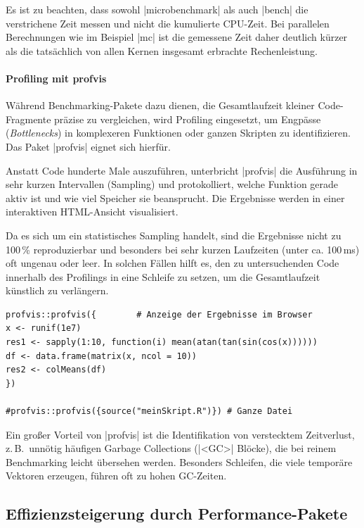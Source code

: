 \documentclass[10pt,twocolumn]{scrartcl}
\renewcommand{\lstinline}{\mycoloredinline}
\begin{document}
Es ist zu beachten, dass sowohl \lstinline|microbenchmark| als auch \lstinline|bench| die verstrichene Zeit messen und nicht die kumulierte CPU-Zeit. Bei parallelen Berechnungen wie im Beispiel \lstinline|mc| ist die gemessene Zeit daher deutlich kürzer als die tatsächlich von allen Kernen insgesamt erbrachte Rechenleistung.


\paragraph{Profiling mit profvis}

Während Benchmarking-Pakete dazu dienen, die Gesamtlaufzeit kleiner Code-Fragmente präzise zu vergleichen, wird Profiling eingesetzt, um Engpässe (\emph{Bottlenecks}) in komplexeren Funktionen oder ganzen Skripten zu identifizieren. Das Paket \lstinline|profvis| eignet sich hierfür.

Anstatt Code hunderte Male auszuführen, unterbricht \lstinline|profvis| die Ausführung in sehr kurzen Intervallen (Sampling) und protokolliert, welche Funktion gerade aktiv ist und wie viel Speicher sie beansprucht. Die Ergebnisse werden in einer interaktiven HTML-Ansicht visualisiert.

Da es sich um ein statistisches Sampling handelt, sind die Ergebnisse nicht zu 100\,\% reproduzierbar und besonders bei sehr kurzen Laufzeiten (unter ca. 100\,ms) oft ungenau oder leer. In solchen Fällen hilft es, den zu untersuchenden Code innerhalb des Profilings in eine Schleife zu setzen, um die Gesamtlaufzeit künstlich zu verlängern.

\begin{lstlisting}
profvis::profvis({        # Anzeige der Ergebnisse im Browser
x <- runif(1e7)
res1 <- sapply(1:10, function(i) mean(atan(tan(sin(cos(x))))))
df <- data.frame(matrix(x, ncol = 10))
res2 <- colMeans(df)
})

#profvis::profvis({source("meinSkript.R")}) # Ganze Datei
\end{lstlisting}

Ein großer Vorteil von \lstinline|profvis| ist die Identifikation von verstecktem Zeitverlust, z.\,B.\ unnötig häufigen Garbage Collections (\lstinline|<GC>| Blöcke), die bei reinem Benchmarking leicht übersehen werden. Besonders Schleifen, die viele temporäre Vektoren erzeugen, führen oft zu hohen GC-Zeiten.


\subsection{Effizienzsteigerung durch Performance-Pakete}
\end{document}
